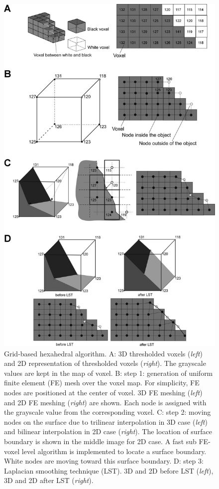 \renewcommand{\imsize}{0.618\linewidth}
\begin{figure}[p]
	\centering
	\includegraphics[width=\imsize]{img/Tsuda2008/Tsuda-04}
	\caption[Grid-based hexahedral algorithm]{Grid-based hexahedral algorithm. A: 3D thresholded voxels (\textit{left}) and 2D representation of thresholded voxels (\textit{right}). The grayscale values are kept in the map of voxel. B: step 1: generation of uniform finite element (FE) mesh over the voxel map. For simplicity, FE nodes are positioned at the center of voxel. 3D FE meshing (\textit{left}) and 2D FE meshing (\textit{right}) are shown. Each node is assigned with the grayscale value from the corresponding voxel. C: step 2: moving nodes on the surface due to trilinear interpolation in 3D case (\textit{left}) and bilinear interpolation in 2D case (\textit{right}). The location of surface boundary is shown in the middle image for 2D case. A fast sub FE-voxel level algorithm is implemented to locate a surface boundary. White nodes are moving toward this surface boundary. D: step 3: Laplacian smoothing technique (LST). 3D and 2D before LST (\textit{left}), 3D and 2D after LST (\textit{right}).}
	\label{fig:hexahedral}
\end{figure}

